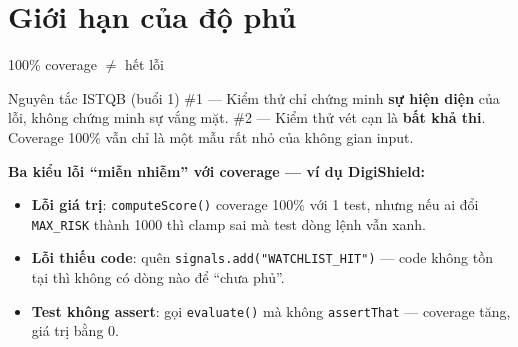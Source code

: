 \documentclass[aspectratio=169,12pt]{beamer}
\begin{document}
\section{Giới hạn của độ phủ}

\begin{frame}{100\% coverage $\neq$ hết lỗi}
  \begin{block}{Nguyên tắc ISTQB (buổi 1) \cite{istqb}}
    \#1 --- Kiểm thử chỉ chứng minh \textbf{sự hiện diện} của lỗi,
    không chứng minh sự vắng mặt. \#2 --- Kiểm thử vét cạn là
    \textbf{bất khả thi}. Coverage 100\% vẫn chỉ là một mẫu rất nhỏ
    của không gian input.
  \end{block}

  \vspace{0.3em}
  \textbf{Ba kiểu lỗi ``miễn nhiễm'' với coverage --- ví dụ DigiShield:}
  \begin{itemize}
    \item \small \textbf{Lỗi giá trị}: \texttt{computeScore()} coverage
          100\% với 1 test, nhưng nếu ai đổi \texttt{MAX\_RISK} thành 1000
          thì clamp sai mà test dòng lệnh vẫn xanh.
    \item \small \textbf{Lỗi thiếu code}: quên
          \texttt{signals.add("WATCHLIST\_HIT")} --- code không tồn tại
          thì không có dòng nào để ``chưa phủ''.
    \item \small \textbf{Test không assert}: gọi \texttt{evaluate()}
          mà không \texttt{assertThat} --- coverage tăng, giá trị bằng 0.
  \end{itemize}
\end{frame}
\end{document}
